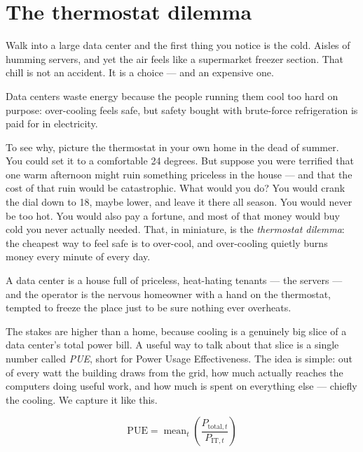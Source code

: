 \section{The thermostat dilemma}

Walk into a large data center and the first thing you notice is the cold. Aisles of humming servers, and yet the air feels like a supermarket freezer section. That chill is not an accident. It is a choice --- and an expensive one.

\begin{keyidea}
Data centers waste energy because the people running them cool too hard on purpose: over-cooling feels safe, but safety bought with brute-force refrigeration is paid for in electricity.
\end{keyidea}

To see why, picture the thermostat in your own home in the dead of summer. You could set it to a comfortable 24 degrees. But suppose you were terrified that one warm afternoon might ruin something priceless in the house --- and that the cost of that ruin would be catastrophic. What would you do? You would crank the dial down to 18, maybe lower, and leave it there all season. You would never be too hot. You would also pay a fortune, and most of that money would buy cold you never actually needed. That, in miniature, is the \emph{thermostat dilemma}: the cheapest way to feel safe is to over-cool, and over-cooling quietly burns money every minute of every day.

\begin{analogy}
A data center is a house full of priceless, heat-hating tenants --- the servers --- and the operator is the nervous homeowner with a hand on the thermostat, tempted to freeze the place just to be sure nothing ever overheats.
\end{analogy}

The stakes are higher than a home, because cooling is a genuinely big slice of a data center's total power bill. A useful way to talk about that slice is a single number called \emph{PUE}, short for Power Usage Effectiveness. The idea is simple: out of every watt the building draws from the grid, how much actually reaches the computers doing useful work, and how much is spent on everything else --- chiefly the cooling. We capture it like this.

\begin{equation}\label{eq:pue}
\mathrm{PUE} = \operatorname{mean}_t \left( \frac{P_{\text{total},t}}{P_{\text{IT},t}} \right)
\end{equation}


